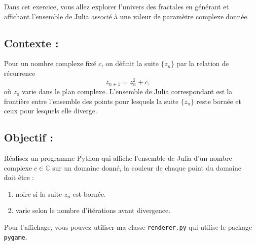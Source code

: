 \documentclass[a4paper,12pt]{article}
\begin{document}
Dans cet exercice, vous allez explorer l'univers des fractales en générant et affichant l'ensemble de Julia associé à une valeur de paramètre complexe donnée. 


\subsection{Contexte :}
Pour un nombre complexe fixé \( c \), on définit la suite \(\{z_n\}\) par la relation de récurrence
\[
z_{n+1} = z_n^2 + c,
\]
où \(z_0\) varie dans le plan complexe. L'ensemble de Julia correspondant est la frontière entre l'ensemble des points pour lesquels la suite \(\{z_n\}\) reste bornée et ceux pour lesquels elle diverge.

\bigskip

\subsection{Objectif :}
Réalisez un programme Python qui affiche l'ensemble de Julia d'un nombre complexe $c\in \mathbb{C}$ sur un domaine donné, la couleur de chaque point du domaine doit être :
\begin{enumerate}
    \item noire si la suite $z_n$ est bornée.
    \item varie selon le nombre d'itérations avant divergence.
\end{enumerate}

Pour l'affichage, vous pouvez utiliser ma classe \texttt{renderer.py} qui utilise le package \texttt{pygame}.

\end{document}
